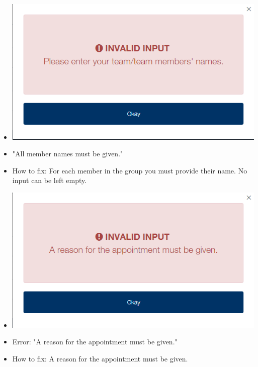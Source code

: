 \begin{itemize}
\begin{itemize}
				\item \includegraphics[width=\linewidth]{images/Screenshots/Errors/NotLoggedIn/Names.png}
				\item "All member names must be given."
				\item How to fix: For each member in the group you must provide their name. No input can be left empty.
				
				\item \includegraphics[width=\linewidth]{images/Screenshots/Errors/NotLoggedIn/Reason.png}
				\item Error: "A reason for the appointment must be given."
				\item How to fix: A reason for the appointment must be given.
				

\end{itemize}
\end{itemize}
